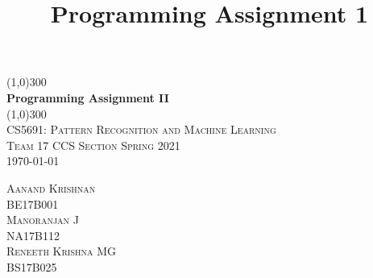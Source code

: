 \documentclass{article}
\title{Programming Assignment 1}
\begin{document}
\begin{titlepage}
	\begin{center}
    \line(1,0){300}\\
    [0.65cm]
	\huge{\bfseries Programming Assignment II}\\
	\line(1,0){300}\\
	\textsc{\Large CS5691: Pattern Recognition and Machine Learning}\\
	\textsc{\large{Team 17 CCS Section Spring 2021}}\\
	\textsc{ \small{\today}}\\
	[5.5cm]     
	\end{center}
	\begin{flushright}
		\textsc{\Large Aanand Krishnan\\\small{BE17B001}}\\
		[0.5cm]
		\textsc{\Large Manoranjan J\\ \small{NA17B112}}\\
		[0.5cm]
		\textsc{\Large Reneeth Krishna MG\\\small{BS17B025}}
	\end{flushright}
\end{titlepage}
\tableofcontents
\newpage




\newpage



\newpage



\newpage


\end{document}
